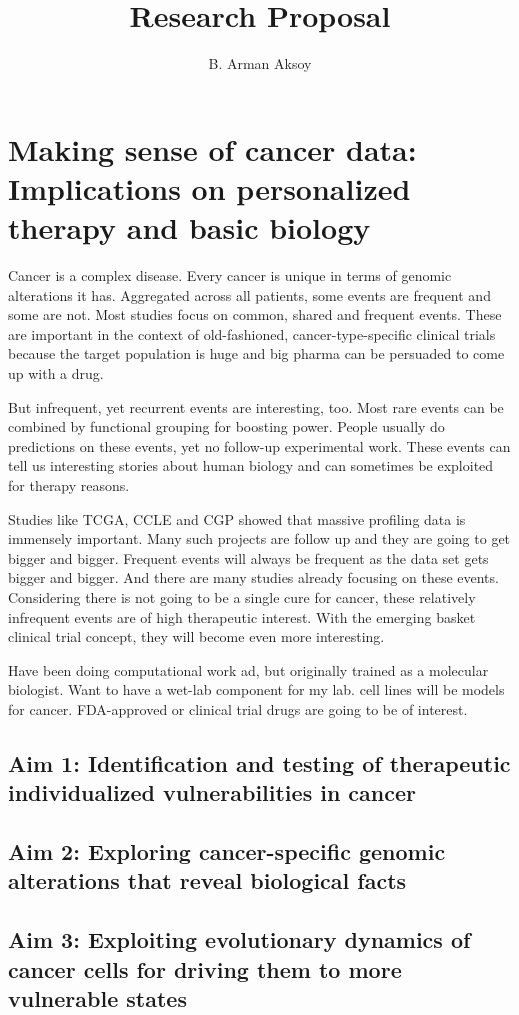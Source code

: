 \documentclass[12pt,letterpaper]{article}
\title{Research Proposal}
\author{B. Arman Aksoy}
\begin{document}
\maketitle

\section{Making sense of cancer data: Implications on personalized therapy and basic biology}
Cancer is a complex disease.
Every cancer is unique in terms of genomic alterations it has.
Aggregated across all patients, some events are frequent and some are not.
Most studies focus on common, shared and frequent events.
These are important in the context of old-fashioned, cancer-type-specific clinical trials
because the target population is huge and big pharma can be persuaded to come up with a drug.

But infrequent, yet recurrent events are interesting, too.
Most rare events can be combined by functional grouping for boosting power.
People usually do predictions on these events,
yet no follow-up experimental work.
These events can tell us interesting stories about human biology
and can sometimes be exploited for therapy reasons.

Studies like TCGA, CCLE and CGP showed that massive profiling data is immensely important.
Many such projects are follow up and they are going to get bigger and bigger.
Frequent events will always be frequent as the data set gets bigger and bigger.
And there are many studies already focusing on these events.
Considering there is not going to be a single cure for cancer,
these relatively infrequent events are of high therapeutic interest.
With the emerging basket clinical trial concept,
they will become even more interesting.

Have been doing computational work ad, but originally trained as a molecular biologist.
Want to have a wet-lab component for my lab.
cell lines will be models for cancer.
FDA-approved or clinical trial drugs are going to be of interest.

\subsection{Aim 1: Identification and testing of therapeutic individualized vulnerabilities in cancer}
\subsection{Aim 2: Exploring cancer-specific genomic alterations that reveal biological facts}
\subsection{Aim 3: Exploiting evolutionary dynamics of cancer cells for driving them to more vulnerable states}
\end{document}
